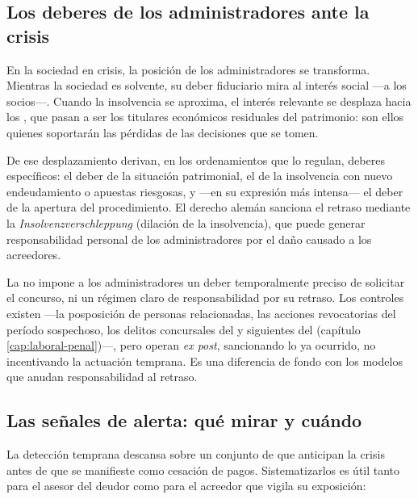 \subsection{Los deberes de los administradores ante la crisis}

En la sociedad en crisis, la posición de los administradores se transforma. Mientras la sociedad es
solvente, su deber fiduciario mira al interés social ---a los socios---. Cuando la insolvencia se
aproxima, el interés relevante se desplaza hacia los , que pasan a ser los
titulares económicos residuales del patrimonio: son ellos quienes soportarán las pérdidas de las
decisiones que se tomen.

De ese desplazamiento derivan, en los ordenamientos que lo regulan, deberes específicos: el deber de
 la situación patrimonial, el de  la insolvencia con nuevo
endeudamiento o apuestas riesgosas, y ---en su expresión más intensa--- el deber de
 la apertura del procedimiento. El derecho alemán sanciona el
retraso mediante la \emph{Insolvenzverschleppung} (dilación de la insolvencia), que puede generar
responsabilidad personal de los administradores por el daño causado a los acreedores.

\begin{alerta}
La \LIR{} no impone a los administradores un deber temporalmente preciso de solicitar el concurso, ni
un régimen claro de responsabilidad por su retraso. Los controles existen ---la posposición de
personas relacionadas, las acciones revocatorias del período sospechoso, los delitos concursales del
 y siguientes del \cpen{} (capítulo \ref{cap:laboral-penal})---, pero operan
\emph{ex post}, sancionando lo ya ocurrido, no incentivando la actuación temprana. Es una diferencia
de fondo con los modelos que anudan responsabilidad al retraso.
\end{alerta}

\bloqueNormativo

\subsection{Las señales de alerta: qué mirar y cuándo}

La detección temprana descansa sobre un conjunto de  que anticipan la crisis
antes de que se manifieste como cesación de pagos. Sistematizarlos es útil tanto para el asesor del
deudor como para el acreedor que vigila su exposición:

